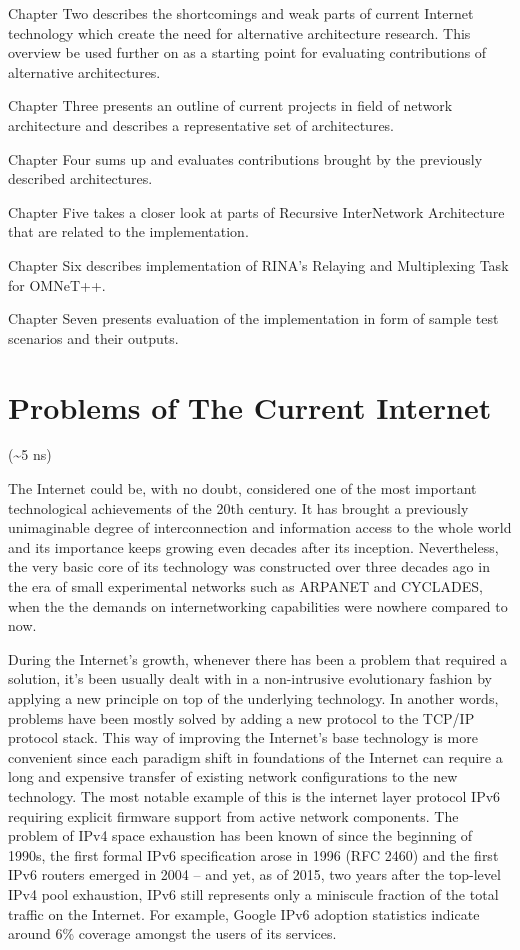         Chapter Two describes the shortcomings and weak parts of current Internet technology which create the need for alternative architecture research. This overview be used further on as a starting point for evaluating contributions of alternative architectures.

        Chapter Three presents an outline of current projects in field of network architecture and describes a representative set of architectures.

        Chapter Four sums up and evaluates contributions brought by the previously described architectures.

        Chapter Five takes a closer look at parts of Recursive InterNetwork Architecture that are related to the implementation.

        Chapter Six describes implementation of RINA's Relaying and Multiplexing Task for OMNeT++.

        Chapter Seven presents evaluation of the implementation in form of sample test scenarios and their outputs.

\chapter{Problems of The Current Internet}
    (\textasciitilde5 ns)

    The Internet could be, with no doubt, considered one of the most important technological achievements of the 20th century. It has brought a previously unimaginable degree of interconnection and information access to the whole world and its importance keeps growing even decades after its inception. Nevertheless, the very basic core of its technology was constructed over three decades ago in the era of small experimental networks such as ARPANET and CYCLADES, when the the demands on internetworking capabilities were nowhere compared to now.

    During the Internet's growth, whenever there has been a problem that required a solution, it's been usually dealt with in a non-intrusive evolutionary fashion by applying a new principle on top of the underlying technology. In another words, problems have been mostly solved by adding a new protocol to the TCP/IP protocol stack. This way of improving the Internet's base technology is more convenient since each paradigm shift in foundations of the Internet can require a long and expensive transfer of existing network configurations to the new technology. The most notable example of this is the internet layer protocol IPv6 requiring explicit firmware support from active network components. The problem of IPv4 space exhaustion has been known of since the beginning of 1990s, the first formal IPv6 specification arose in 1996 (RFC 2460) and the first IPv6 routers emerged in 2004 -- and yet, as of 2015, two years after the top-level IPv4 pool exhaustion, IPv6 still represents only a miniscule fraction of the total traffic on the Internet. For example, Google IPv6 adoption statistics indicate around 6\% coverage amongst the users of its services.

